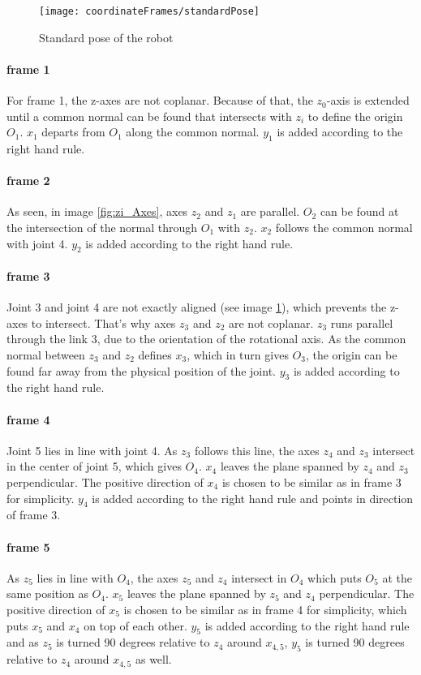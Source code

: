 \begin{figure}[h]
	\texttt{[image: coordinateFrames/standardPose]}
	\caption{Standard pose of the robot}
	\label{fig:StandardPose}
\end{figure}

\paragraph{frame 1}
For frame 1, the z-axes are not coplanar. 
Because of that, the  $z_0$-axis is extended until a common normal can be found that intersects with $z_i$ to define the origin $O_1$.
$x_1$ departs from $O_1$ along the common normal.
$y_1$ is added according to the right hand rule.

\paragraph{frame 2}
As seen, in image \ref{fig:zi_Axes}, axes $z_2$ and $z_1$ are parallel. $O_2$ can be found at the intersection of the normal through $O_1$ with $z_2$. $x_2$ follows the common normal with joint 4.
$y_2$ is added according to the right hand rule.

\paragraph{frame 3}
Joint 3 and joint 4 are not exactly aligned (see image \ref{fig:StandardPose}), which prevents the z-axes to intersect. That's why axes $z_3$ and $z_2$ are not coplanar. 
$z_3$ runs parallel through the link 3, due to the orientation of the rotational axis.
As the common normal between $z_3$ and $z_2$ defines $x_3$, which in turn gives $O_3$, the origin can be found far away from the physical position of the joint.
$y_3$ is added according to the right hand rule.

\paragraph{frame 4}
Joint 5 lies in line with joint 4.
As $z_3$ follows this line, the axes  $z_4$ and $z_3$ intersect in the center of joint 5, which gives $O_4$. 
$x_4$ leaves the plane spanned by  $z_4$ and $z_3$ perpendicular.
The positive direction of $x_4$ is chosen to be similar as in frame 3 for simplicity.
$y_4$ is added according to the right hand rule and points in direction of frame 3.

\paragraph{frame 5}
As $z_5$ lies  in line with $O_4$, the axes  $z_5$ and $z_4$ intersect in $O_4$ which puts $O_5$ at the same position as $O_4$.
$x_5$ leaves the plane spanned by  $z_5$ and $z_4$ perpendicular.
The positive direction of $x_5$ is chosen to be similar as in frame 4 for simplicity, which puts $x_5$ and $x_4$ on top of each other. 
$y_5$ is added according to the right hand rule and as $z_5$ is turned 90 degrees relative to $z_4$ around $x_{4,5}$, $y_5$ is turned 90 degrees relative to $z_4$ around $x_{4,5}$ as well.

